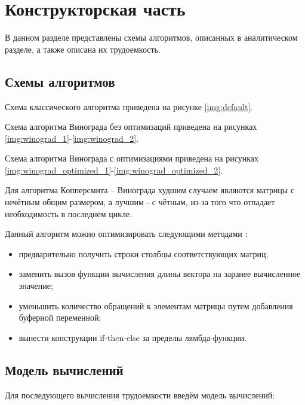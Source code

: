 \chapter{Конструкторская часть}

В данном разделе представлены схемы алгоритмов, описанных в аналитическом разделе, а также описана их трудоемкость.

\section{Схемы алгоритмов}

Схема классического алгоритма приведена на рисунке \ref{img:default}.

Схема алгоритма Винограда без оптимизаций приведена на рисунках \ref{img:winograd_1}-\ref{img:winograd_2}.
\clearpage

Схема алгоритма Винограда с оптимизациями приведена на рисунках \ref{img:winograd_optimized_1}-\ref{img:winograd_optimized_2}.
\clearpage



Для алгоритма Копперсмита -- Винограда худшим случаем являются матрицы с нечётным общим размером, а лучшим - с чётным, из-за того что отпадает необходимость в последнем цикле.

Данный алгоритм можно оптимизировать следующими методами \cite{optimisations}:
\begin{itemize}
	\item предварительно получить строки столбцы соответствующих матриц;
	\item заменить вызов функции вычисления длины вектора на заранее вычисленное значение;
	\item уменьшить количество обращений к элементам матрицы путем добавления буферной переменной;
	\item вынести конструкции if-then-else за пределы лямбда-функции.
\end{itemize}

\section{Модель вычислений}
Для последующего вычисления трудоемкости введём модель вычислений:

